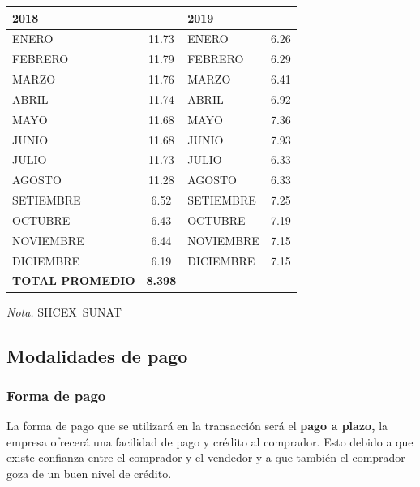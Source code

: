 \documentclass[
  stu,
  floatsintext,
  longtable,
  a4paper,
  nolmodern,
  notxfonts,
  notimes,
  12pt,
  colorlinks=true,linkcolor=blue,citecolor=blue,urlcolor=blue]{apa7}
\newcounter{none} %
\begin{document}
\begin{table}

{\caption{{Precio FOB promedio de las exportaciones de PERÚ en los
últimos 2 años hacia EE. UU}{\label{tbl-mytable2}}}}

{\def\LTcaptype{none} %
\begin{longtable}[]{@{}lclc@{}}
\toprule\noalign{}
\textbf{2018} & & \textbf{2019} & \\
\midrule\noalign{}
\endhead
\bottomrule\noalign{}
\endlastfoot
ENERO & 11.73 & ENERO & 6.26 \\
FEBRERO & 11.79 & FEBRERO & 6.29 \\
MARZO & 11.76 & MARZO & 6.41 \\
ABRIL & 11.74 & ABRIL & 6.92 \\
MAYO & 11.68 & MAYO & 7.36 \\
JUNIO & 11.68 & JUNIO & 7.93 \\
JULIO & 11.73 & JULIO & 6.33 \\
AGOSTO & 11.28 & AGOSTO & 6.33 \\
SETIEMBRE & 6.52 & SETIEMBRE & 7.25 \\
OCTUBRE & 6.43 & OCTUBRE & 7.19 \\
NOVIEMBRE & 6.44 & NOVIEMBRE & 7.15 \\
DICIEMBRE & 6.19 & DICIEMBRE & 7.15 \\
\textbf{TOTAL PROMEDIO} & \textbf{8.398} & & \\
\end{longtable}
}

\noindent \emph{Nota.} SIICEX~SUNAT

\end{table}

\subsection{Modalidades de pago}\label{modalidades-de-pago}

\subsubsection{Forma de pago}\label{forma-de-pago}

La forma de pago que se utilizará en la transacción será el \textbf{pago
a plazo,} la empresa ofrecerá una facilidad de pago y crédito al
comprador. Esto debido a que existe confianza entre el comprador y el
vendedor y a que también el comprador goza de un buen nivel de crédito.
\end{document}
